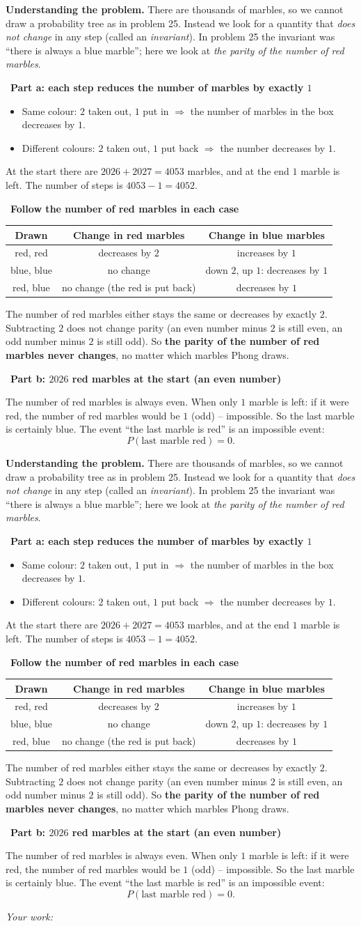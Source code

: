 \documentclass[11pt]{article}
\newif\ifsol \soltrue
\newcommand{\probsol}[1]{%
  \begin{lrbox}{\solmeasure}\begin{minipage}{\dimexpr\linewidth-24pt\relax}#1\end{minipage}\end{lrbox}%
  \ifsol
    \begin{solbox}#1\end{solbox}%
  \else
    \setlength{\solht}{\dimexpr\ht\solmeasure+\dp\solmeasure+0.85cm\relax}%
    \ifdim\solht<1.35cm\setlength{\solht}{1.35cm}\fi
    \ifdim\solht>\StudentMaxWork\setlength{\solht}{\StudentMaxWork}\fi
    \begin{tcolorbox}[colback=white,colframe=Line,boxrule=0.8pt,arc=5pt,
      left=8pt,right=8pt,top=4pt,bottom=4pt,height=\solht]{\footnotesize\color{Slate}\itshape\WorkWord}\end{tcolorbox}%
  \fi}
\newlength{\StudentMaxWork}\setlength{\StudentMaxWork}{7.5cm}
\newcommand{\step}[2]{\par\smallskip\noindent{\bfseries\color{tmBlue!85!black}\StepWord~#1.}\ {\bfseries #2}\par\nopagebreak}
\def\WorkWord{Your work:}
\def\StepWord{Step}
\begin{document}
\probsol{
\textbf{Understanding the problem.} There are thousands of marbles, so we cannot draw a probability tree as in problem 25. Instead we look for
a quantity that \emph{does not change} in any step (called an \emph{invariant}). In problem 25 the invariant was ``there is always a blue
marble''; here we look at \emph{the parity of the number of red marbles}.

\step{1}{Part a: each step reduces the number of marbles by exactly $1$}
\begin{itemize}[leftmargin=1.2em,itemsep=1pt,topsep=2pt]
\item Same colour: $2$ taken out, $1$ put in $\Rightarrow$ the number of marbles in the box decreases by $1$.
\item Different colours: $2$ taken out, $1$ put back $\Rightarrow$ the number decreases by $1$.
\end{itemize}
At the start there are $2026+2027=4053$ marbles, and at the end $1$ marble is left. The number of steps is $4053-1=4052$.

\step{2}{Follow the number of red marbles in each case}
\begin{center}\begin{tabular}{|c|c|c|}\hline
Drawn & Change in red marbles & Change in blue marbles\\\hline
red, red & decreases by $2$ & increases by $1$\\\hline
blue, blue & no change & down $2$, up $1$: decreases by $1$\\\hline
red, blue & no change (the red is put back) & decreases by $1$\\\hline
\end{tabular}\end{center}
\begin{proofbox}The number of red marbles either stays the same or decreases by exactly $2$. Subtracting $2$ does not change parity (an even
number minus $2$ is still even, an odd number minus $2$ is still odd). So \textbf{the parity of the number of red marbles never changes}, no
matter which marbles Phong draws.\end{proofbox}

\step{3}{Part b: $2026$ red marbles at the start (an even number)}
The number of red marbles is always even. When only $1$ marble is left: if it were red, the number of red marbles would be $1$ (odd) --
impossible. So the last marble is certainly blue. The event ``the last marble is red'' is an impossible event:
\[P(\text{last marble red})=0.\]

}
\end{document}
